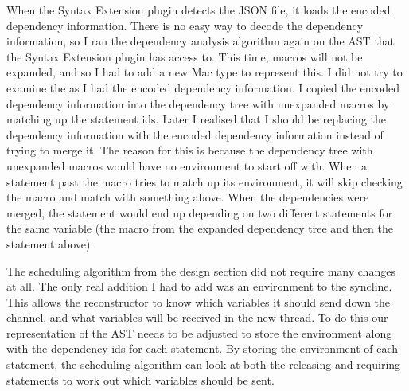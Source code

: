 When the Syntax Extension plugin detects the JSON file, it loads the encoded dependency information. There is no easy way to decode the dependency information, so I ran the dependency analysis algorithm again on the AST that the Syntax Extension plugin has access to. This time, macros will not be expanded, and so I had to add a new Mac type to represent this. I did not try to examine the  as I had the encoded dependency information. I copied the encoded dependency information into the dependency tree with unexpanded macros by matching up the statement ids. Later I realised that I should be replacing the dependency information with the encoded dependency information instead of trying to merge it. The reason for this is because the dependency tree with unexpanded macros would have no environment to start off with. When a statement past the macro tries to match up its environment, it will skip checking the macro and match with something above. When the dependencies were merged, the statement would end up depending on two different statements for the same variable (the macro from the expanded dependency tree and then the statement above).

The scheduling algorithm from the design section did not require many changes at all. The only real addition I had to add was an environment to the syncline. This allows the reconstructor to know which variables it should send down the channel, and what variables will be received in the new thread.
To do this our representation of the AST needs to be adjusted to store the environment along with the dependency ids for each statement. By storing the environment of each statement, the scheduling algorithm can look at both the releasing and requiring statements to work out which variables should be sent.

